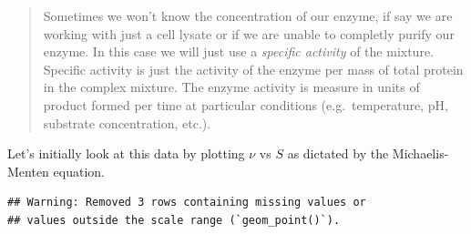 \documentclass[
]{article}
\newenvironment{Shaded}{\begin{snugshade}}{\end{snugshade}}
\newcommand{\AttributeTok}[1]{\textcolor[rgb]{0.13,0.29,0.53}{#1}}
\newcommand{\DecValTok}[1]{\textcolor[rgb]{0.00,0.00,0.81}{#1}}
\newcommand{\FloatTok}[1]{\textcolor[rgb]{0.00,0.00,0.81}{#1}}
\newcommand{\FunctionTok}[1]{\textcolor[rgb]{0.13,0.29,0.53}{\textbf{#1}}}
\newcommand{\NormalTok}[1]{#1}
\newcommand{\OtherTok}[1]{\textcolor[rgb]{0.56,0.35,0.01}{#1}}
\newcommand{\SpecialCharTok}[1]{\textcolor[rgb]{0.81,0.36,0.00}{\textbf{#1}}}
\newcommand{\StringTok}[1]{\textcolor[rgb]{0.31,0.60,0.02}{#1}}
\begin{document}
\begin{quote}
Sometimes we won't know the concentration of our enzyme, if say we are working with just a cell lysate or if we are unable to completly purify our enzyme. In this case we will just use a \emph{specific activity} of the mixture. Specific activity is just the activity of the enzyme per mass of total protein in the complex mixture. The enzyme activity is measure in units of product formed per time at particular conditions (e.g.~temperature, pH, substrate concentration, etc.).
\end{quote}

Let's initially look at this data by plotting \(\nu\) vs \(S\) as dictated by the Michaelis-Menten equation.

\begin{Shaded}
\end{Shaded}

\begin{verbatim}
## Warning: Removed 3 rows containing missing values or
## values outside the scale range (`geom_point()`).
\end{verbatim}
\end{document}
